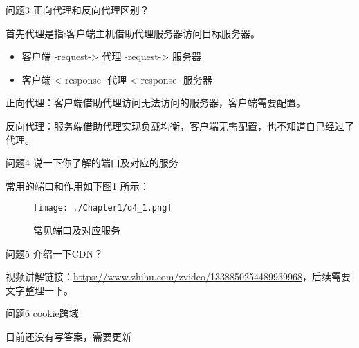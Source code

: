 \documentclass[cn,11pt,color=blue,lang=cn]{elegantbook}
\begin{document}
\begin{custom}{问题3}
正向代理和反向代理区别？
\end{custom}
\begin{solution}
首先代理是指:客户端主机借助代理服务器访问目标服务器。
\begin{itemize}
\item 客户端 -request-> 代理 -request-> 服务器
\item 客户端 <-response- 代理 <-response- 服务器
\end{itemize}

正向代理：客户端借助代理访问无法访问的服务器，客户端需要配置。

反向代理：服务端借助代理实现负载均衡，客户端无需配置，也不知道自己经过了代理。
\end{solution}

\begin{custom}{问题4}
说一下你了解的端口及对应的服务
\end{custom}
\begin{solution}
常用的端口和作用如下图\ref{fig4_1} 所示：
\begin{figure}[htbp]
\centering
\texttt{[image: ./Chapter1/q4\_1.png]}
\caption{常见端口及对应服务}
\label{fig4_1}
\end{figure}

\end{solution}

\begin{custom}{问题5}
介绍一下CDN？
\end{custom}
\begin{solution}
视频讲解链接：\href{https://www.zhihu.com/zvideo/1338850254489939968}{https://www.zhihu.com/zvideo/1338850254489939968}，后续需要文字整理一下。
\end{solution}

\begin{custom}{问题6}
cookie跨域
\end{custom}
\begin{solution}
目前还没有写答案，需要更新
\end{solution}
\end{document}
